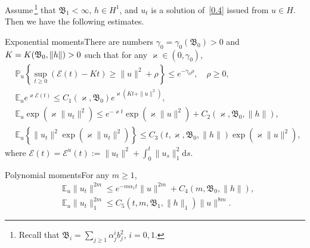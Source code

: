\documentclass[AHL,Unicode,longabstracts]{cedram}
\newcommand{\pP}{{\mathbb P}}
\newcommand{\E}{{\mathbb E}}
\newcommand{\EE}{{\mathcal E}}
\newcommand{\ty}{\infty}
\newcommand{\BBBB}{{\mathfrak B}}
\newcommand{\dd}{\mathrm{d}}
\begin{document}
\begin{lemm}\label{L:5.1}
Assume\,\footnote{Recall that $\BBBB_{i}=\sum_{j\ge1}\alpha_j^i b_j^2$, $i=0,1$.} that $\BBBB_{1}< \ty$, $h\in H^1$, and $u_t$ is a solution of~\eqref{0.4} issued from $u\in H$. Then we have the following estimates.

Exponential moments\pointir There are numbers $\gamma_0=\gamma_0(\BBBB_{0})>0$ and $K=\linebreak K(\BBBB_{0},\|h\|)>0$ such that for any $\varkappa\in(0,\gamma_0)$,
\begin{align}
& \pP_u\left\{\sup_{t\ge0} \left(\EE(t) -Kt\right)\ge \|u\|^2+\rho
\right\} \le e^{-\gamma_0\rho}, \quad \rho\ge0,\label{5.6}
\\
&\E_u e^{\varkappa \EE(t)} \le C_1(\varkappa, \BBBB_0) {e^{\varkappa(Kt+\|u\|^2)}},\label{5.1}
\\
&\E_u \exp(\varkappa \|u_t\|^2)\le e^{-\varkappa t} \exp(\varkappa \|u\|^2)+C_2(\varkappa, \BBBB_{0},\|h\|),\label{5.2}
\\
&\E_u \left\{\|u_t\|^2\exp(\varkappa \|u_t\|^2)\right\}\le C_3(t,\varkappa, \BBBB_{0},\|h\|) \exp(\varkappa \|u\|^2),\label{5.4}
\end{align}
where $\EE(t)=\EE^u(t):= \|u_t\|^2+\int_0^t \|u_s\|_{1}^2\dd s$.

Polynomial moments\pointir For any $m\ge1$,
\begin{align}
&\E_u \|u_t\|^{2m}\le e^{-m\alpha_1 t} \|u\|^{2m}+C_4(m, \BBBB_{0}, \|h\|),\label{5.3}
\\
&\E_u \|u_t\|_1^{2m}\le C_5(t,m, \BBBB_{1},\|h\|_1) \|u\|^{8m}.\label{5.5}
\end{align}
\end{lemm}
\end{document}
